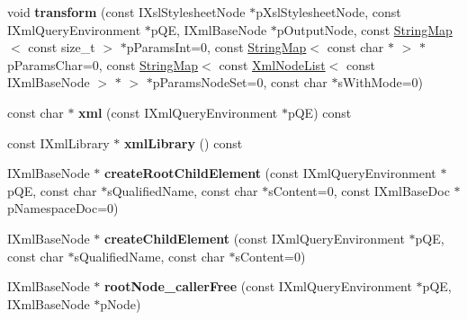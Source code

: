 \begin{DoxyCompactItemize}
\item 
\hypertarget{classgeneral__server_1_1XmlBaseDoc_a25a4da41156fecfa92b35e72eae6ff68}{void {\bfseries transform} (const \-I\-Xsl\-Stylesheet\-Node $\ast$p\-Xsl\-Stylesheet\-Node, const \-I\-Xml\-Query\-Environment $\ast$p\-Q\-E, \-I\-Xml\-Base\-Node $\ast$p\-Output\-Node, const \hyperlink{classgeneral__server_1_1StringMap}{\-String\-Map}$<$ const size\-\_\-t $>$ $\ast$p\-Params\-Int=0, const \hyperlink{classgeneral__server_1_1StringMap}{\-String\-Map}$<$ const char $\ast$ $>$ $\ast$p\-Params\-Char=0, const \hyperlink{classgeneral__server_1_1StringMap}{\-String\-Map}$<$ const \hyperlink{classgeneral__server_1_1XmlNodeList}{\-Xml\-Node\-List}$<$ const \-I\-Xml\-Base\-Node $>$ $\ast$ $>$ $\ast$p\-Params\-Node\-Set=0, const char $\ast$s\-With\-Mode=0)}\label{classgeneral__server_1_1XmlBaseDoc_a25a4da41156fecfa92b35e72eae6ff68}

\item 
\hypertarget{classgeneral__server_1_1XmlBaseDoc_aedd70e562ebba4b33f86b8cb32f5b364}{const char $\ast$ {\bfseries xml} (const \-I\-Xml\-Query\-Environment $\ast$p\-Q\-E) const }\label{classgeneral__server_1_1XmlBaseDoc_aedd70e562ebba4b33f86b8cb32f5b364}

\item 
\hypertarget{classgeneral__server_1_1XmlBaseDoc_a5d8869d18ca54c94e5949b61e293c14c}{const \-I\-Xml\-Library $\ast$ {\bfseries xml\-Library} () const }\label{classgeneral__server_1_1XmlBaseDoc_a5d8869d18ca54c94e5949b61e293c14c}

\item 
\hypertarget{classgeneral__server_1_1XmlBaseDoc_ad9468a00a749923bb7d643709847a5a8}{\-I\-Xml\-Base\-Node $\ast$ {\bfseries create\-Root\-Child\-Element} (const \-I\-Xml\-Query\-Environment $\ast$p\-Q\-E, const char $\ast$s\-Qualified\-Name, const char $\ast$s\-Content=0, const \-I\-Xml\-Base\-Doc $\ast$p\-Namespace\-Doc=0)}\label{classgeneral__server_1_1XmlBaseDoc_ad9468a00a749923bb7d643709847a5a8}

\item 
\hypertarget{classgeneral__server_1_1XmlBaseDoc_a2ef767578dee541c9f4ca633633caa5a}{\-I\-Xml\-Base\-Node $\ast$ {\bfseries create\-Child\-Element} (const \-I\-Xml\-Query\-Environment $\ast$p\-Q\-E, const char $\ast$s\-Qualified\-Name, const char $\ast$s\-Content=0)}\label{classgeneral__server_1_1XmlBaseDoc_a2ef767578dee541c9f4ca633633caa5a}

\item 
\hypertarget{classgeneral__server_1_1XmlBaseDoc_a13b49a31037475ee4f28b6d9e00d2c24}{\-I\-Xml\-Base\-Node $\ast$ {\bfseries root\-Node\-\_\-caller\-Free} (const \-I\-Xml\-Query\-Environment $\ast$p\-Q\-E, \-I\-Xml\-Base\-Node $\ast$p\-Node)}\label{classgeneral__server_1_1XmlBaseDoc_a13b49a31037475ee4f28b6d9e00d2c24}


\end{DoxyCompactItemize}
